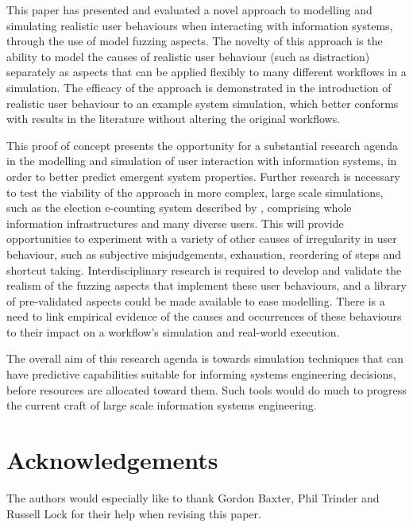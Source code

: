 \documentclass{llncs}
\begin{document}

This paper has presented and evaluated a novel approach to modelling and simulating realistic user behaviours when
interacting with information systems, through the use of model fuzzing aspects. The novelty of this approach is the
ability to model the causes of realistic user behaviour (such as distraction) separately as aspects that can
be applied flexibly to many different workflows in a simulation. The efficacy of the approach is
demonstrated in the introduction of realistic user behaviour to an example system simulation, which better conforms with
results in the literature without altering the original workflows.

This proof of concept presents the opportunity for a substantial research agenda in the modelling and simulation of user
interaction with information systems, in order to better predict emergent system properties. Further research is
necessary to test the viability of the approach in more complex, large scale simulations, such as
the election e-counting system described by \citet{lock07observations}, comprising whole information infrastructures and
many diverse users. This will provide opportunities to experiment with a variety of other causes of
irregularity in user behaviour, such as subjective misjudgements, exhaustion, reordering of steps and shortcut taking.
Interdisciplinary research is required to develop and validate the realism of the fuzzing aspects that implement these
user behaviours, and a library of pre-validated aspects could be made available to ease modelling. There is a need to
link empirical evidence of the causes and occurrences of these behaviours to their impact on a workflow's simulation and
real-world execution.

The overall aim of this research agenda is towards simulation techniques that can have predictive capabilities suitable
for informing systems engineering decisions, before resources are allocated toward them. Such tools would do much to
progress the current craft of large scale information systems engineering.

\section*{Acknowledgements}
The authors would especially like to thank Gordon Baxter, Phil Trinder and
Russell Lock for their help when revising this paper.






\end{document}
